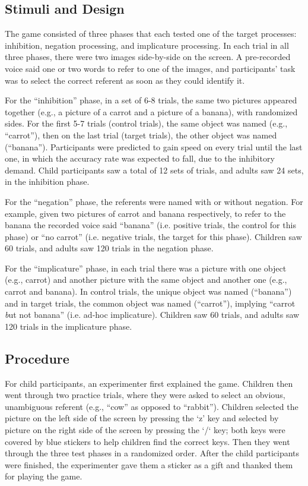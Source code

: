 \documentclass[10pt,letterpaper]{article}
\begin{document}
\subsection{Stimuli and Design}

The game consisted of three phases that each tested one of the target processes: inhibition, negation processing, and implicature processing. In each trial in all three phases, there were two images side-by-side on the screen. A pre-recorded voice said one or two words to refer to one of the images, and participants' task was to select the correct referent as soon as they could identify it.

For the ``inhibition'' phase, in a set of 6-8 trials, the same two pictures appeared together (e.g., a picture of a carrot and a picture of a banana), with randomized sides. For the first 5-7 trials (control trials), the same object was named (e.g., ``carrot''), then on the last trial  (target trials), the other object was named (``banana''). Participants were predicted to gain speed on every trial until the last one, in which the accuracy rate was expected to fall, due to the inhibitory demand. Child participants saw a total of 12 sets of trials, and adults saw 24 sets, in the inhibition phase.

For the ``negation'' phase, the referents were named with or without negation. For example, given two pictures of carrot and banana respectively, to refer to the banana the recorded voice said ``banana'' (i.e. positive trials, the control for this phase) or ``no carrot'' (i.e. negative trials, the target for this phase). Children saw 60 trials, and adults saw 120 trials in the negation phase. 

For the ``implicature'' phase, in each trial there was a picture with one object (e.g., carrot) and another picture with the same object and another one (e.g., carrot and banana). In control trials, the unique object was named (``banana'') and in target trials, the common object was named (``carrot''), implying ``carrot {\emph but not banana''} (i.e. ad-hoc implicature). Children saw 60 trials, and adults saw 120 trials in the implicature phase. 

\subsection{Procedure}

For child participants, an experimenter first explained the game.  Children then went through two practice trials, where they were asked to select an obvious, unambiguous referent (e.g., ``cow'' as opposed to ``rabbit'').  Children selected the picture on the left side of the screen by pressing the `z' key and selected by picture on the right side of the screen by pressing the `/` key; both keys were covered by blue stickers to help children find the correct keys. Then they went through the three test phases in a randomized order.  After the child participants were finished, the experimenter gave them a sticker as a gift and thanked them for playing the game.
\end{document}
